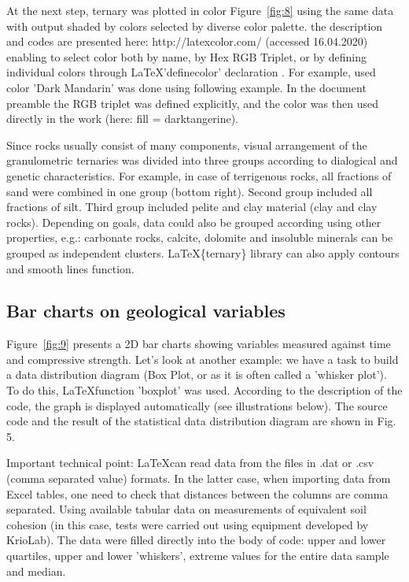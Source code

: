 \documentclass[a4paper,10pt]{article}
\begin{document}
At the next step, ternary was plotted in color Figure~\ref{fig:8} using the same data with output shaded by colors selected by diverse color palette.  the description and codes are presented here: http://latexcolor.com/ (accessed 16.04.2020) enabling to select color both by name, by Hex RGB Triplet, or by defining individual colors through \LaTeX \space 'definecolor' declaration \cite{Kern}.
For example, used color 'Dark Mandarin' was done using following example. In the document preamble the RGB triplet was defined explicitly, and the color was then used directly in the work (here: fill = darktangerine).

Since rocks usually consist of many components, visual arrangement of the granulometric ternaries was divided into three groups according to dialogical and genetic characteristics. For example, in case of terrigenous rocks, all fractions of sand were combined in one group (bottom right). Second group included all fractions of silt. Third group included pelite and clay material (clay and clay rocks). Depending on goals, data could also be grouped according using other properties, e.g.: carbonate rocks, calcite, dolomite and insoluble minerals can be grouped as independent clusters. \LaTeX \space \{ternary\} library can also apply contours and smooth lines function.

\subsection{Bar charts on geological variables}

Figure~\ref{fig:9} presents a 2D bar charts showing variables measured against time and compressive strength.
Let's look at another example: we have a task to build a data distribution diagram (Box Plot, or as it is often called a 'whisker plot').
To do this, \LaTeX \space function 'boxplot' was used. According to the description of the code, the graph is displayed automatically (see illustrations below). The source code and the result of the statistical data distribution diagram are shown in Fig. 5. 

Important technical point: \LaTeX \space can read data from the files in .dat or .csv (comma separated value) formats. In the latter case, when importing data from Excel tables, one need to check that distances between the columns are comma separated. Using available tabular data on measurements of equivalent soil cohesion (in this case, tests were carried out using equipment developed by KrioLab). The data were filled directly into the body of code: upper and lower quartiles, upper and lower 'whiskers', extreme values for the entire data sample and median.
\end{document}
